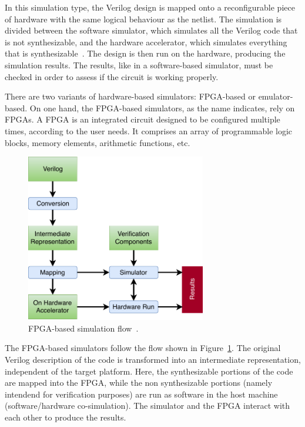 In this simulation type, the Verilog design is mapped onto a reconfigurable
piece of hardware with the same logical behaviour as the netlist.  The simulation
is divided between the software simulator, which simulates all the Verilog code
that is not synthesizable, and the hardware accelerator, which simulates
everything that is synthesizable~\cite{khandelwal:gatelevel}. The design is then
run on the hardware, producing the simulation results. The results, like in a
software-based simulator, must be checked in order to assess if the circuit is
working properly.

There are two variants of hardware-based simulators: \ac{FPGA}-based or
emulator-based. On one hand, the \ac{FPGA}-based simulators, as the name indicates,
rely on \ac{FPGA}s. A \ac{FPGA} is an integrated circuit designed to be configured 
multiple times, according to the user needs. It comprises an array of programmable logic 
blocks, memory elements, arithmetic functions, etc.

\begin{figure}[!htb]
	\centering
	\includegraphics[width=0.7\textwidth]{Figures/FPGAsim.pdf}
	\caption{FPGA-based simulation flow~\cite{khandelwal:gatelevel}.}
	\label{fig:fpga}
\end{figure}

The \ac{FPGA}-based simulators follow the flow shown in Figure~\ref{fig:fpga}. The
original Verilog description of the code is transformed into an intermediate
representation, independent of the target platform. Here, the synthesizable
portions of the code are mapped into the \ac{FPGA}, while the non synthesizable
portions (namely intendend for verification purposes) are run as software in the
host machine (software/hardware co-simulation). The simulator and the \ac{FPGA}
interact with each other to produce the results.

